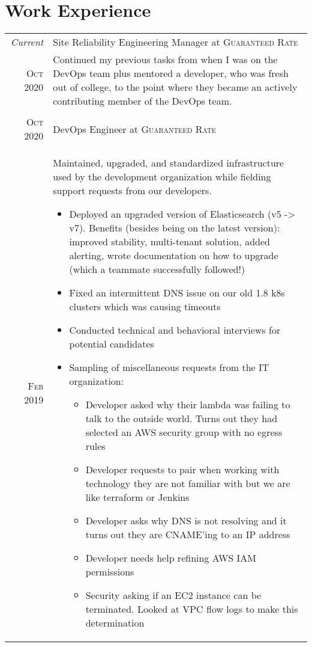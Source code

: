 \documentclass[a4paper,10pt]{article}
\begin{document}
\section{Work Experience}
\begin{tabular}{r|p{13cm}}
 \emph{Current} & Site Reliability Engineering Manager at \textsc{Guaranteed Rate} \\
 \textsc{Oct 2020} &
 \footnotesize{Continued my previous tasks from when I was on the DevOps team plus mentored a developer, who was fresh out of college, to the point where they became an actively contributing member of the DevOps team.} 
 \\
 \multicolumn{2}{c}{} \\ 
 \textsc{Oct 2020} & DevOps Engineer at \textsc{Guaranteed Rate} \\
 \textsc{Feb 2019} &
 \footnotesize{Maintained, upgraded, and standardized infrastructure used by the development organization while fielding support requests from our developers.} 
 \begin{itemize}
 \item \footnotesize{Deployed an upgraded version of Elasticsearch (v5 -> v7). Benefits (besides being on the latest version): improved stability, multi-tenant solution, added alerting, wrote documentation on how to upgrade (which a teammate successfully followed!)}
 \item \footnotesize{Fixed an intermittent DNS issue on our old 1.8 k8s clusters which was causing timeouts}
 \item \footnotesize{Conducted technical and behavioral interviews for potential candidates}
 \item \footnotesize{Sampling of miscellaneous requests from the IT organization:}
   \begin{itemize}
   \item \footnotesize{Developer asked why their lambda was failing to talk to the outside world. Turns out they had selected an AWS security group with no egress rules}
   \item \footnotesize{Developer requests to pair when working with technology they are not familiar with but we are like terraform or Jenkins}
   \item \footnotesize{Developer asks why DNS is not resolving and it turns out they are CNAME'ing to an IP address}
   \item \footnotesize{Developer needs help refining AWS IAM permissions}
   \item \footnotesize{Security asking if an EC2 instance can be terminated. Looked at VPC flow logs to make this determination}

\end{itemize}
\end{itemize}
\end{tabular}
\end{document}
